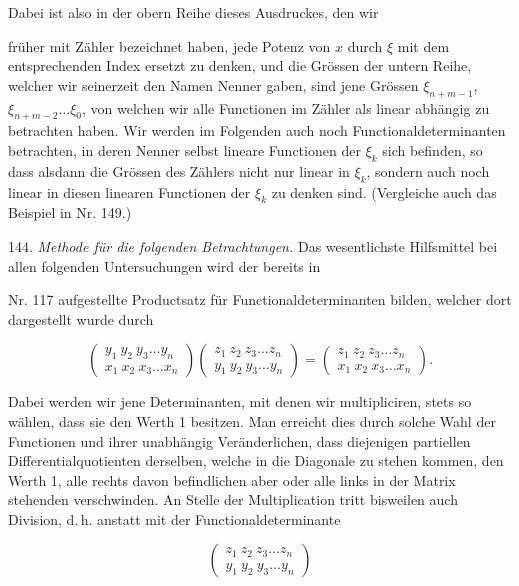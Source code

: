 \documentclass[11pt]{article}
\providecommand{\weberpage}[1]{}
\providecommand{\weq}[2]{\begin{equation}\tag{#1}#2\end{equation}}
\begin{document}
Dabei ist also in der obern Reihe dieses Ausdruckes, den wir


\weberpage{150}
fr\"uher mit Z\"ahler bezeichnet haben, jede Potenz von $x$ durch $\xi$ mit dem
entsprechenden Index ersetzt zu denken, und die Gr\"ossen der untern Reihe, welcher wir
seinerzeit den Namen Nenner gaben, sind jene Gr\"ossen $\xi_{n+m-1}$, $\xi_{n+m-2}\ldots
\xi_0$, von welchen wir alle Functionen im Z\"ahler als linear abh\"angig zu betrachten
haben. Wir werden im Folgenden auch noch Functionaldeterminanten betrachten, in deren Nenner
selbst lineare Functionen der $\xi_k$ sich befinden, so dass alsdann die Gr\"ossen des
Z\"ahlers nicht nur linear in $\xi_k$, sondern auch noch linear in diesen linearen
Functionen der $\xi_k$ zu denken sind. (Vergleiche auch das Beispiel in Nr. 149.)

144. \textit{Methode f\"ur die folgenden Betrachtungen.} Das wesentlichste Hilfsmittel bei
allen folgenden Untersuchungen wird der bereits in

Nr. 117 aufgestellte Productsatz f\"ur Functionaldeterminanten bilden, welcher dort
dargestellt wurde durch

\[
\left(
\begin{array}{cc}
y_1\ y_2\ y_3 \ldots y_n \\
x_1\ x_2\ x_3 \ldots x_n
\end{array}
\right)
\left(
\begin{array}{cc}
z_1\ z_2\ z_3 \ldots z_n \\
y_1\ y_2\ y_3 \ldots y_n
\end{array}
\right)
=
\left(
\begin{array}{cc}
z_1\ z_2\ z_3 \ldots z_n \\
x_1\ x_2\ x_3 \ldots x_n
\end{array}
\right).
\]

Dabei werden wir jene Determinanten, mit denen wir multipliciren, stets so w\"ahlen, dass
sie den Werth 1 besitzen. Man erreicht dies durch solche Wahl der Functionen und ihrer
unabh\"angig Ver\"anderlichen, dass diejenigen partiellen Differentialquotienten derselben,
welche in die Diagonale zu stehen kommen, den Werth 1, alle rechts davon befindlichen aber
oder alle links in der Matrix stehenden verschwinden. An Stelle der Multiplication tritt
bisweilen auch Division, d.\,h. anstatt mit der Functionaldeterminante

\weq{1}{
\left(
\begin{array}{cc}
z_1\ z_2\ z_3 \ldots z_n \\
y_1\ y_2\ y_3 \ldots y_n
\end{array}
\right)
}
\end{document}
